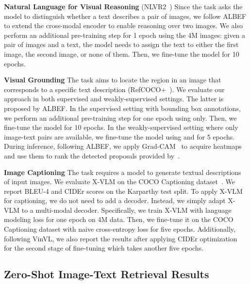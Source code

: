 \documentclass[nohyperref]{article}
\theoremstyle{plain}
\theoremstyle{definition}
\theoremstyle{remark}
\begin{document}
\noindent \textbf{Natural Language for Visual Reasoning}  (NLVR2~\cite{suhr2018corpus}) Since the task asks the model to distinguish whether a text describes a pair of images, we follow ALBEF to extend the cross-modal encoder to enable reasoning over two images. We also perform an additional pre-training step for 1 epoch using the 4M images: given a pair of images and a text, the model needs to assign the text to either the first image, the second image, or none of them. Then, we fine-tune the model for 10 epochs. 


\noindent \textbf{Visual Grounding} The task aims to locate the region in an image that corresponds to a specific text description (RefCOCO+~\cite{yu2016modeling}). We evaluate our approach in both supervised and weakly-supervised settings. The latter is proposed by ALBEF. In the supervised setting with bounding box annotations, we perform an additional pre-training step for one epoch using  only. Then, we fine-tune the model for 10 epochs. In the weakly-supervised setting where only image-text pairs are available, we fine-tune the model using  and  for 5 epochs. During inference, following ALBEF, we apply Grad-CAM~\cite{selvaraju2017grad} to acquire heatmaps and use them to rank the detected proposals provided by~\cite{yu2018mattnet}. 


\noindent \textbf{Image Captioning} The task requires a model to generate textual descriptions of input images. We evaluate X-VLM on the COCO Captioning dataset~\cite{chen2015microsoft}. We report BLEU-4 and CIDEr scores on the Karparthy test split. To apply X-VLM for captioning, we do not need to add a decoder. Instead, we simply adapt X-VLM to a multi-modal decoder. Specifically, we train X-VLM with language modeling loss for one epoch on 4M data. Then, we fine-tune it on the COCO Captioning dataset with naive cross-entropy loss for five epochs. Additionally, following VinVL, we also report the results after applying CIDEr optimization~\cite{rennie2017self} for the second stage of fine-tuning which takes another five epochs. 




\subsection{Zero-Shot Image-Text Retrieval Results}
\label{app:zeroshot}
\end{document}
